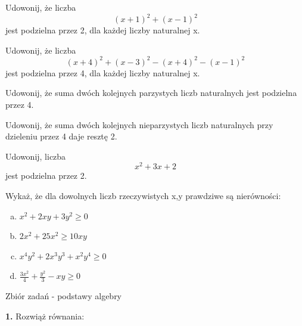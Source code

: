 \documentclass[12pt,a4paper]{article}
\theoremstyle{break}
\begin{document}
	\begin{zad}
		Udowonij, że liczba
		$$(x+1)^2+(x-1)^2$$
		jest podzielna przez 2, dla każdej liczby naturalnej x.
	\end{zad}

	\begin{zad}
		Udowonij, że liczba
		$$(x+4)^2+(x-3)^2-(x+4)^2-(x-1)^2$$
		jest podzielna przez 4, dla każdej liczby naturalnej x.
	\end{zad}

	\begin{zad}
		Udowonij, że suma dwóch kolejnych parzystych liczb naturalnych jest podzielna przez 4.
	\end{zad}

	\begin{zad}
		Udowonij, że suma dwóch kolejnych nieparzystych liczb naturalnych przy dzieleniu przez 4 daje resztę 2.
	\end{zad}

	\begin{zad}
	Udowonij, liczba
	$$x^2+3x+2$$
	jest podzielna przez 2.
	\end{zad}

	\begin{zad}
		Wykaż, że dla dowolnych liczb rzeczywistych x,y prawdziwe są nierówności:
	\end{zad}
	\begin{enumerate}[a)]
		\item $x^2+2xy+3y^2\geq 0$
		\item $2x^2+25x^2\geq 10xy$
		\item $x^4y^2+2x^3y^3+x^2y^4\geq0$
		\item $\frac{3x^2}{4}+\frac{y^2}{3}-xy\geq0$
	\end{enumerate}

	\newpage

\begin{center}
	\LARGE Zbiór zadań - podstawy algebry
\end{center}
		\begin{mdframed}[%
		linecolor=white,%
		innertopmargin=\topskip,
		shadowsize=0,%
		innertopmargin=5,%
		innerbottommargin=5,%
		leftmargin=10,%
		rightmargin=10,%
		backgroundcolor=gray!20,%
		innertopmargin=0pt,]
		\vspace{0.2cm}
		\textbf{1.} Rozwiąż równania:
	\end{mdframed}
\end{document}

